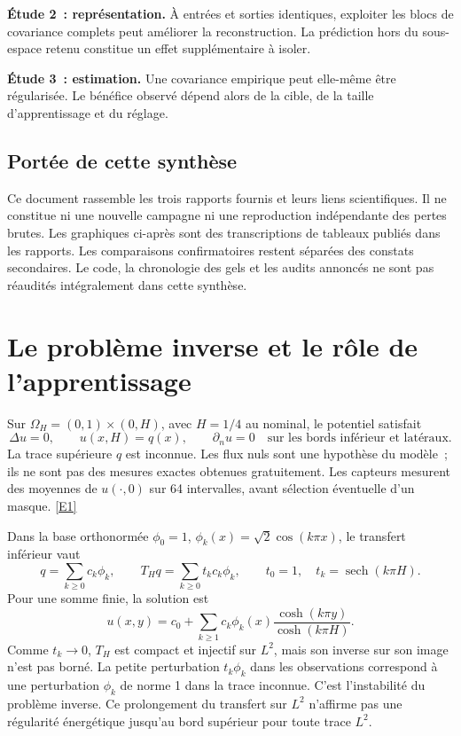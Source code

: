 \documentclass[11pt,a4paper]{article}
\DeclareRobustCommand{\eref}[1]{\hyperlink{ref#1}{[#1]}}
\begin{document}
\textbf{Étude 2~: représentation.} À entrées et sorties identiques, exploiter les blocs de
covariance complets peut améliorer la reconstruction. La prédiction hors du sous-espace
retenu constitue un effet supplémentaire à isoler.

\textbf{Étude 3~: estimation.} Une covariance empirique peut elle-même être régularisée.
Le bénéfice observé dépend alors de la cible, de la taille d'apprentissage et du réglage.

\subsection*{Portée de cette synthèse}
Ce document rassemble les trois rapports fournis et leurs liens scientifiques. Il ne constitue
ni une nouvelle campagne ni une reproduction indépendante des pertes brutes. Les graphiques
ci-après sont des transcriptions de tableaux publiés dans les rapports. Les comparaisons
confirmatoires restent séparées des constats secondaires. Le code, la chronologie des gels
et les audits annoncés ne sont pas réaudités intégralement dans cette synthèse.

\newpage
\section{Le problème inverse et le rôle de l'apprentissage}
Sur $\Omega_H=(0,1)\times(0,H)$, avec $H=1/4$ au nominal, le potentiel satisfait
\[
\Delta u=0,\qquad u(x,H)=q(x),\qquad
\partial_nu=0\quad\text{sur les bords inférieur et latéraux}.
\]
La trace supérieure $q$ est inconnue. Les flux nuls sont une hypothèse du modèle~; ils ne
sont pas des mesures exactes obtenues gratuitement. Les capteurs mesurent des moyennes
de $u(\cdot,0)$ sur 64 intervalles, avant sélection éventuelle d'un masque. \eref{E1}

Dans la base orthonormée $\phi_0=1$, $\phi_k(x)=\sqrt2\cos(k\pi x)$, le transfert inférieur vaut
\[
q=\sum_{k\geq0}c_k\phi_k,\qquad
T_Hq=\sum_{k\geq0}t_kc_k\phi_k,\qquad
t_0=1,\quad t_k=\operatorname{sech}(k\pi H).
\]
Pour une somme finie, la solution est
\[
u(x,y)=c_0+\sum_{k\geq1}c_k\phi_k(x)
\frac{\cosh(k\pi y)}{\cosh(k\pi H)}.
\]
Comme $t_k\to0$, $T_H$ est compact et injectif sur $L^2$, mais son inverse sur son image
n'est pas borné. La petite perturbation $t_k\phi_k$ dans les observations correspond à une
perturbation $\phi_k$ de norme 1 dans la trace inconnue. C'est l'instabilité du problème inverse.
Ce prolongement du transfert sur $L^2$ n'affirme pas une régularité énergétique jusqu'au bord
supérieur pour toute trace $L^2$.
\end{document}
